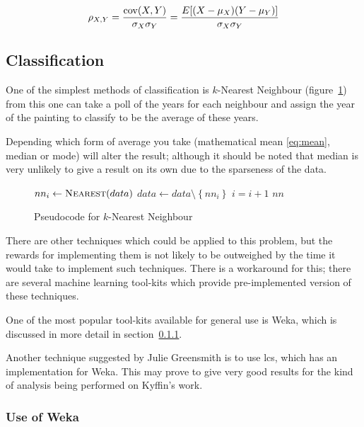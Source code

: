 \begin{equation}\label{eq:pearsons}
\rho_{X,Y}={\mathrm{cov}(X,Y) \over \sigma_X \sigma_Y} ={E[(X-\mu_X)(Y-\mu_Y)] \over \sigma_X\sigma_Y}
\end{equation}


\subsection{Classification}
One of the simplest methods of classification is $k$-Nearest Neighbour (figure~\ref{fig:knn}) from
this one can take a poll of the years for each neighbour and assign the year of the painting to
classify to be the average of these years.

Depending which form of average you take (mathematical mean \eqref{eq:mean}, median or mode) will
alter the result; although it should be noted that median is very unlikely to give a result on its
own due to the sparseness of the data.

\begin{figure}[h]
\begin{algorithmic}
 
    \State $nn_i \gets \Call{Nearest}{data}$
    \State $data \gets data \setminus \left\{{nn_i}\right\}$
    \State $i = i + 1$
  \EndFor
  \Statex
  \Return $nn$
\EndFunction
\end{algorithmic}
\caption{Pseudocode for $k$-Nearest Neighbour}\label{fig:knn}
\end{figure}

There are other techniques which could be applied to this problem, but the rewards for 
implementing them is not likely to be outweighed by the time it would take to implement such
techniques. There is a workaround for this; there are several machine learning tool-kits which 
provide pre-implemented version of these techniques.

One of the most popular tool-kits available for general use is Weka\cite{Hall2009WEKA}, which is discussed in more
detail in section~\ref{sec:bg-weka}.

Another technique suggested by Julie Greensmith is to use \gls{lcs}\cite{Bacardit2013Largescale}, 
which has an implementation for Weka. This may prove to give very good results for the kind of
analysis being performed on Kyffin's work.

\subsubsection{Use of Weka}\label{sec:bg-weka}

